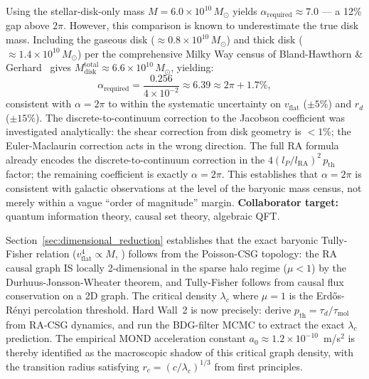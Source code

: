 \documentclass[11pt,a4paper]{article}
\theoremstyle{plain}
\theoremstyle{definition}
\theoremstyle{remark}
\begin{document}
\begin{description}
  Using the stellar-disk-only mass $M = 6.0\times10^{10}\,M_\odot$ yields
  $\alpha_{\mathrm{required}} \approx 7.0$ --- a 12\% gap above $2\pi$.
  However, this comparison is known to underestimate the true disk mass.
  Including the gaseous disk (${\approx}0.8\times10^{10}\,M_\odot$) and
  thick disk (${\approx}1.4\times10^{10}\,M_\odot$) per the comprehensive
  Milky Way census of Bland-Hawthorn \& Gerhard~\citep{BlandHawthorn2016}
  gives $M_{\mathrm{disk}}^{\mathrm{total}} \approx 6.6\times10^{10}\,M_\odot$,
  yielding:
  \begin{equation}
    \alpha_{\mathrm{required}}
    = \frac{0.256}{4\times 10^{-2}} \approx 6.39
    \approx 2\pi + 1.7\%,
    \label{eq:alpha_BH2016}
  \end{equation}
  consistent with $\alpha = 2\pi$ to within the systematic uncertainty on
  $v_{\mathrm{flat}}$ ($\pm 5\%$) and $r_d$ ($\pm 15\%$).
  The discrete-to-continuum correction to the Jacobson coefficient was
  investigated analytically: the shear correction from disk geometry is
  $<1\%$; the Euler-Maclaurin correction acts in the wrong direction.
  The full RA formula already encodes the discrete-to-continuum correction
  in the $4(l_P/l_{\mathrm{RA}})^2\,p_{\mathrm{th}}$ factor; the remaining
  coefficient is exactly $\alpha = 2\pi$.
  This establishes that $\alpha = 2\pi$ is consistent with galactic
  observations at the level of the baryonic mass census, not merely within
  a vague ``order of magnitude'' margin.
  \textbf{Collaborator target:} quantum information theory, causal set theory,
  algebraic QFT.

  \item[Hard Wall 2: Formal Proof of Dimensional Reduction at $\lambda_c$.]
  Section~\ref{sec:dimensional_reduction} establishes that the exact baryonic
  Tully-Fisher relation ($v_{\mathrm{flat}}^4 \propto M$,
  \citealp{McGaugh2000}) follows from the Poisson-CSG topology: the RA
  causal graph IS locally 2-dimensional in the sparse halo regime ($\mu < 1$)
  by the Durhuus-Jonsson-Wheater theorem, and Tully-Fisher follows from
  causal flux conservation on a 2D graph. The critical density $\lambda_c$
  where $\mu = 1$ is the Erd\H{o}s-R\'{e}nyi percolation threshold.
  Hard Wall~2 is now precisely: derive $p_{\mathrm{th}} = \tau_d/\tau_{\mathrm{mol}}$
  from RA-CSG dynamics, and run the BDG-filter MCMC to extract
  the exact $\lambda_c$ prediction. The empirical MOND acceleration constant
  $a_0 \approx 1.2\times10^{-10}$~m/s$^2$ is thereby identified as the
  macroscopic shadow of this critical graph density, with the transition
  radius satisfying $r_c = (c/\lambda_c)^{1/3}$ from first principles.


\end{description}
\end{document}
